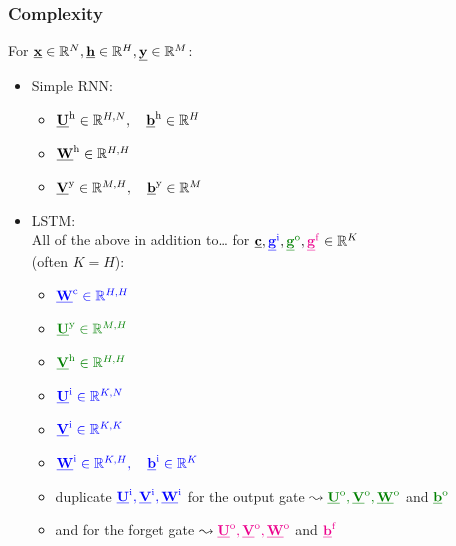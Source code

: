 \begin{frame}\frametitle{Complexity}
		For $\vec x \in \R^N, \vec h \in \R^H, \vec y \in \R^M$:\\
		\begin{itemize}
		\item[]
			Simple RNN:\\
			\begin{itemize}
			\item $\vec U^{\mathrm{h}} \in \R^{H,N},\quad \vec b^{\mathrm{h}} \in \R^{H}$
			\item $\vec W^{\mathrm{h}} \in \R^{H,H}$
			\item $\vec V^{\mathrm{y}} \in \R^{M,H},\quad \vec b^{\mathrm{y}} \in \R^{M}$
			\end{itemize}
			\pause
			
		\item[]
			LSTM:\\
			All of the above in addition to\ldots
			for $\vec c, {\color{blue}\vec g^{\mathrm{i}}}, {\color{darkgreen}\vec g^{\mathrm{o}}}, {\color{magenta}\vec g^{\mathrm{f}}} \in \R^K$\\
			(often $K=H$):\\
			\pause
			\begin{itemize}
			\item $\color{blue}\vec W^{\mathrm{c}} \in \R^{H,H}$
			\item $\color{darkgreen}\vec U^{\mathrm{y}} \in \R^{M,H}$
			\item $\color{darkgreen}\vec V^{\mathrm{h}} \in \R^{H,H}$
			\item $\color{blue}\vec U^{\mathrm{i}} \in \R^{K,N}$
			\item $\color{blue}\vec V^{\mathrm{i}} \in \R^{K,K}$
			\item $\color{blue}\vec W^{\mathrm{i}} \in \R^{K,H}, \quad \vec b^{\mathrm{i}} \in \R^{K}$
			\item duplicate $\color{blue}\vec U^{\mathrm{i}}, \color{blue}\vec V^{\mathrm{i}}, \color{blue}\vec W^{\mathrm{i}}$
			for the output gate $\leadsto \color{darkgreen}\vec U^{\mathrm{o}}, \color{darkgreen}\vec V^{\mathrm{o}}, \color{darkgreen}\vec W^{\mathrm{o}}$ and $\color{darkgreen}\vec b^{\mathrm{o}}$
			\item and for the forget gate $\leadsto \color{magenta}\vec U^{\mathrm{o}}, \color{magenta}\vec V^{\mathrm{o}}, \color{magenta}\vec W^{\mathrm{o}}$ and $\color{magenta}\vec b^{\mathrm{f}}$
			\end{itemize}
		\end{itemize}
		
\end{frame}
